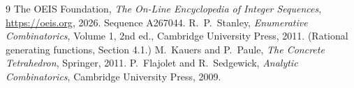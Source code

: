 \documentclass[11pt,a4paper]{article}
\theoremstyle{plain}
\theoremstyle{definition}
\begin{document}
\begin{thebibliography}{9}
 The OEIS Foundation, \emph{The On-Line Encyclopedia of Integer
Sequences}, \url{https://oeis.org}, 2026. Sequence A267044.
 R.~P.~Stanley, \emph{Enumerative Combinatorics}, Volume 1, 2nd ed.,
Cambridge University Press, 2011. (Rational generating functions, Section 4.1.)
 M.~Kauers and P.~Paule, \emph{The Concrete Tetrahedron}, Springer, 2011.
 P.~Flajolet and R.~Sedgewick, \emph{Analytic Combinatorics}, Cambridge
University Press, 2009.
\end{thebibliography}
\end{document}
